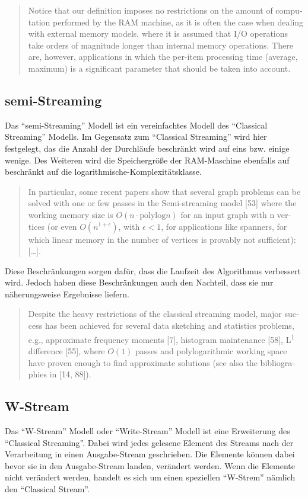 \foreignblockquote{english}[\cite{Ribichini2007}]{
Notice that our definition imposes no restrictions on the amount
of computation performed by the RAM machine, as it is often the case when
dealing with external memory models, where it is assumed that I/O operations
take orders of magnitude longer than internal memory operations. There
are, however, applications in which the per-item processing time (average,
maximum) is a significant parameter that should be taken into account.
}

\subsection{semi-Streaming}
Das \enquote{semi-Streaming} Modell ist ein vereinfachtes Modell des
\enquote{Classical Streaming} Modells. Im Gegensatz zum \enquote{Classical Streaming}
wird hier festgelegt, das die Anzahl der Durchläufe beschränkt wird auf eins bzw.
einige wenige. Des Weiteren wird die Speichergröße der RAM-Maschine ebenfalls
auf beschränkt auf die logarithmische-Komplexitätsklasse.

\foreignblockquote{english}[\cite{Ribichini2007}]{
In particular, some recent papers show that several graph problems can be
solved with one or few passes in the Semi-streaming model [53] where the
working memory size is $O(n · \text{polylog} n)$ for an input graph with n
vertices (or even $O(n^{1 + \epsilon})$, with $\epsilon < 1$, for applications
like spanners, for which linear memory in the number of vertices is provably not
sufficient): [\dots].
}

Diese Beschränkungen sorgen dafür, dass die Laufzeit des Algorithmus verbessert
wird. Jedoch haben diese Beschränkungen auch den Nachteil, dass sie nur
näherungsweise Ergebnisse liefern.

\foreignblockquote{english}[\cite{Ribichini2007}]{
Despite the heavy restrictions of the classical streaming model, major
success has been achieved for several data sketching and statistics problems,
e.g., approximate frequency moments [7], histogram maintenance [58],
L\textsuperscript{1} difference [55], where $O(1)$ passes and polylogarithmic
working space have proven enough to find approximate solutions (see also the
bibliographies in [14, 88]).
}

\subsection{W-Stream}
Das \enquote{W-Stream} Modell oder \enquote{Write-Stream} Modell ist eine
Erweiterung des \enquote{Classical Streaming}. Dabei wird jedes gelesene Element
des Streams nach der Verarbeitung in einen Ausgabe-Stream geschrieben. Die
Elemente können dabei bevor sie in den Ausgabe-Stream landen, verändert werden.
Wenn die Elemente nicht verändert werden, handelt es sich um einen speziellen
\enquote{W-Strem} nämlich den \enquote{Classical Stream}.

